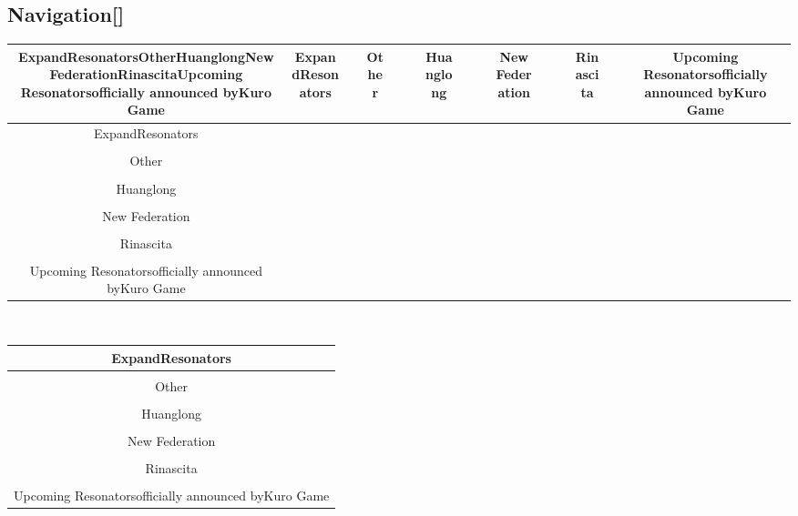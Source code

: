 \documentclass[a4paper,12pt]{article}
\begin{document}
\subsection*{Navigation[]}\n\n\begin{tabular}{|c|c|c|c|c|c|c|c|c|c|c|c|c|c|c|c|c|} \hline
ExpandResonatorsOtherHuanglongNew FederationRinascitaUpcoming Resonatorsofficially announced byKuro Game & ExpandResonators &  & Other &  &  & Huanglong &  &  & New Federation &  &  & Rinascita &  &  & Upcoming Resonatorsofficially announced byKuro Game &  \\
 \hline
ExpandResonators \\
 \\
Other &  \\
 \\
Huanglong &  \\
 \\
New Federation &  \\
 \\
Rinascita &  \\
 \\
Upcoming Resonatorsofficially announced byKuro Game &  \\
\end{tabular}\\ \par \vspace{0.5cm}

\begin{tabular}{|c|} \hline
ExpandResonators \\
 \hline
 \\
Other &  \\
 \\
Huanglong &  \\
 \\
New Federation &  \\
 \\
Rinascita &  \\
 \\
Upcoming Resonatorsofficially announced byKuro Game &  \\
\end{tabular}\\ \par \vspace{0.5cm}
\end{document}
